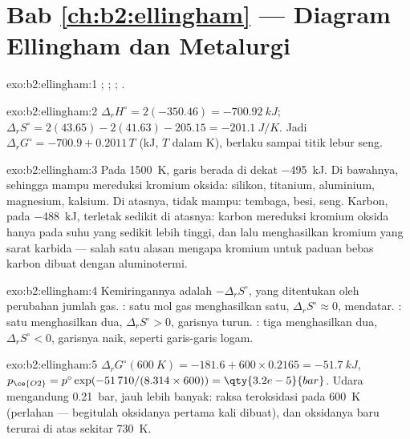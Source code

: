 \section*{Bab \ref{ch:b2:ellingham} --- Diagram Ellingham dan Metalurgi}

\begin{solution}{exo:b2:ellingham:1}
; ; ;
.
\end{solution}

\begin{solution}{exo:b2:ellingham:2}
$\Delta_r H^\circ = 2(-350.46) = \qty{-700.92}{kJ}$; $\Delta_r S^\circ = 2(43.65)
- 2(41.63) - 205.15 = \qty{-201.1}{J/K}$. Jadi $\Delta_r G^\circ = -700.9 +
0.2011\,T$ (\unit{kJ}, $T$ dalam \unit{K}), berlaku sampai titik lebur seng.
\end{solution}

\begin{solution}{exo:b2:ellingham:3}
Pada \qty{1500}{K}, garis  berada di dekat \qty{-495}{kJ}. Di
bawahnya, sehingga mampu mereduksi kromium oksida: silikon, titanium,
aluminium, magnesium, kalsium. Di atasnya, tidak mampu: tembaga, besi,
seng. Karbon, pada \qty{-488}{kJ}, terletak sedikit di atasnya: karbon
mereduksi kromium oksida hanya pada suhu yang sedikit lebih tinggi, dan
lalu menghasilkan kromium yang sarat karbida --- salah satu alasan mengapa
kromium untuk paduan bebas karbon dibuat dengan aluminotermi.
\end{solution}

\begin{solution}{exo:b2:ellingham:4}
Kemiringannya adalah $-\Delta_r S^\circ$, yang ditentukan oleh perubahan
jumlah gas. : satu mol gas menghasilkan satu,
$\Delta_r S^\circ \approx 0$, mendatar. : satu
menghasilkan dua, $\Delta_r S^\circ > 0$, garisnya turun.
: tiga menghasilkan dua, $\Delta_r S^\circ < 0$,
garisnya naik, seperti garis-garis logam.
\end{solution}

\begin{solution}{exo:b2:ellingham:5}
$\Delta_r G^\circ(\qty{600}{K}) = -181.6 + 600 \times 0.2165 = \qty{-51.7}{kJ}$,
$p_{\ce{O2}} = p^\circ\exp(-51\,710/(8.314 \times 600)) = \qty{3.2e-5}{bar}$.
Udara mengandung \qty{0.21}{bar}, jauh lebih banyak: raksa teroksidasi pada
\qty{600}{K} (perlahan --- begitulah oksidanya pertama kali dibuat), dan
oksidanya baru terurai di atas sekitar \qty{730}{K}.
\end{solution}

